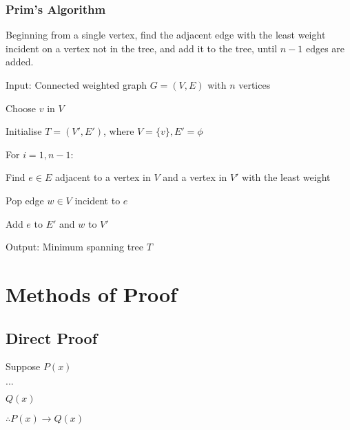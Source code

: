 \documentclass[12pt, a4paper]{article}
\begin{document}
\begin{multicols*}{3}
\subsubsection{Prim's Algorithm}
Beginning from a single vertex, find the adjacent edge with the least weight incident on a vertex not in the tree, and add it to the tree, until $n-1$ edges are added.
\begin{enumproof}[parsep=0em]
  \item Input: Connected weighted graph $G = (V, E)$ with $n$ vertices
  \item Choose $v$ in $V$
  \item Initialise $T = (V', E')$, where $V = \{v\}, E' = \phi$
  \item For $i =1,n-1$:
    \begin{enumproof}[parsep=0em]
    \item Find $e \in E$ adjacent to a vertex in $V$ and a vertex in $V'$ with the least weight
    \item Pop edge $w \in V$ incident to $e$
    \item Add $e$ to $E'$ and $w$ to $V'$
    \end{enumproof}
  \item Output: Minimum spanning tree $T$
\end{enumproof}

\colbreak
\section*{Methods of Proof}
\subsection{Direct Proof}
\begin{enumproof}[parsep=0em]
  \item Suppose $P(x)$
    \begin{enumproof}[parsep=0em]
  \item $...$
  \item $Q(x)$
  \end{enumproof}
  \item $\therefore P(x) \rightarrow Q(x)$
\end{enumproof}


\end{multicols*}
\end{document}
